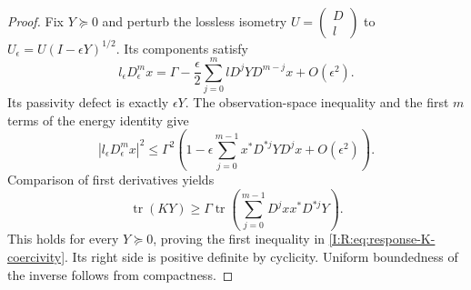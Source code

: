 \begin{proof}
Fix $Y\succeq0$ and perturb the lossless isometry
$U=\begin{pmatrix}D\\l\end{pmatrix}$ to
$U_\epsilon=U(I-\epsilon Y)^{1/2}$.  Its components satisfy
\[
 l_\epsilon D_\epsilon^mx
 =\Gamma-\frac\epsilon2
   \sum_{j=0}^{m}lD^jYD^{m-j}x+O(\epsilon^2).
\]
Its passivity defect is exactly $\epsilon Y$.  The observation-space
inequality and the first $m$ terms of the energy identity give
\[
 |l_\epsilon D_\epsilon^mx|^2
 \le\Gamma^2\left(1-\epsilon
   \sum_{j=0}^{m-1}x^*D^{*j}YD^jx+O(\epsilon^2)\right).
\]
Comparison of first derivatives yields
\[
 \operatorname{tr}(KY)\ge\Gamma\operatorname{tr}\left(
     \sum_{j=0}^{m-1}D^jxx^*D^{*j}Y\right).
\]
This holds for every $Y\succeq0$, proving the first inequality in
\eqref{I:R:eq:response-K-coercivity}.  Its right side is positive definite
by cyclicity.  Uniform boundedness of the inverse follows from
compactness.
\end{proof}

